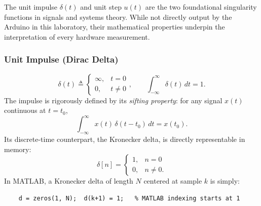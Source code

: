 \documentclass[11pt,letterpaper]{article}
\begin{document}
The unit impulse $\delta(t)$ and unit step $u(t)$ are the two foundational singularity functions in signals and systems theory. While not directly output by the Arduino in this laboratory, their mathematical properties underpin the interpretation of every hardware measurement.

\subsubsection{Unit Impulse (Dirac Delta)}
\begin{equation}
    \delta(t) \triangleq \begin{cases} \infty, & t = 0 \\ 0, & t \neq 0 \end{cases}, \qquad \int_{-\infty}^{\infty} \delta(t)\, dt = 1.
\end{equation}
The impulse is rigorously defined by its \emph{sifting property}: for any signal $x(t)$ continuous at $t = t_0$,
\begin{equation}
    \int_{-\infty}^{\infty} x(t)\,\delta(t - t_0)\, dt = x(t_0).
    \label{eq:sifting}
\end{equation}
Its discrete-time counterpart, the Kronecker delta, is directly representable in memory:
\begin{equation}
    \delta[n] = \begin{cases} 1, & n = 0 \\ 0, & n \neq 0. \end{cases}
\end{equation}
In MATLAB, a Kronecker delta of length $N$ centered at sample $k$ is simply:
\begin{verbatim}
    d = zeros(1, N);  d(k+1) = 1;   % MATLAB indexing starts at 1
\end{verbatim}
\end{document}
